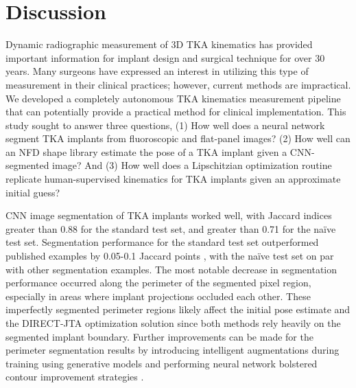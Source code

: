 {\section{Discussion}
Dynamic radiographic measurement of 3D TKA kinematics has provided important information for implant design and surgical technique for over 30 years. Many surgeons have expressed an interest in utilizing this type of measurement in their clinical practices; however, current methods are impractical. We developed a completely autonomous TKA kinematics measurement pipeline that can potentially provide a practical method for clinical implementation. This study sought to answer three questions, (1) How well does a neural network segment TKA implants from fluoroscopic and flat-panel images? (2) How well can an NFD shape library estimate the pose of a TKA implant given a CNN-segmented image? And (3) How well does a Lipschitzian optimization routine replicate human-supervised kinematics for TKA implants given an approximate initial guess?

CNN image segmentation of TKA implants worked well, with Jaccard indices greater than 0.88 for the standard test set, and greater than 0.71 for the naïve test set. Segmentation performance for the standard test set outperformed published examples by 0.05-0.1 Jaccard points \cite{zhouUNetNestedUNet2018,rodriguesDeepSegmentationLeverages2019}, with the naïve test set on par with other segmentation examples. The most notable decrease in segmentation performance occurred along the perimeter of the segmented pixel region, especially in areas where implant projections occluded each other. These imperfectly segmented perimeter regions likely affect the initial pose estimate and the DIRECT-JTA optimization solution since both methods rely heavily on the segmented implant boundary. Further improvements can be made for the perimeter segmentation results by introducing intelligent augmentations during training using generative models \cite{hatayaFasterAutoAugmentLearning2019} and performing neural network bolstered contour improvement strategies \cite{yuanSegFixModelAgnosticBoundary2020}.

}
